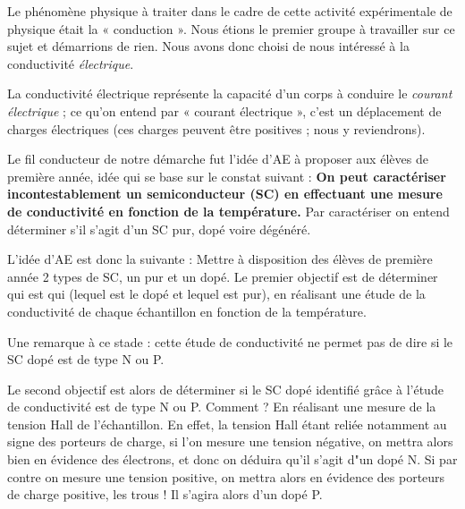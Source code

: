 Le phénomène physique à traiter dans le cadre de cette activité expérimentale de physique était la « conduction ». 
Nous étions le premier groupe à travailler sur ce sujet et démarrions de rien. 
Nous avons donc choisi de nous intéressé à la conductivité \textit{électrique}.

La conductivité électrique représente la capacité d'un corps à conduire le \textit{courant électrique} ; 
ce qu'on entend par « courant électrique », c'est un déplacement de charges électriques 
(ces charges peuvent être positives ; nous y reviendrons).

\bigskip
Le fil conducteur de notre démarche fut l'idée d'AE à proposer aux élèves de première année, 
idée qui se base sur le constat suivant :
\textbf{On peut caractériser incontestablement un semiconducteur (SC) en effectuant 
une mesure de conductivité en fonction de la température.}
Par caractériser on entend déterminer s'il s'agit d'un SC pur, dopé voire dégénéré.

\bigskip
L'idée d'AE est donc la suivante :
Mettre à disposition des élèves de première année 2 types de SC, un pur et un dopé. 
Le premier objectif est de déterminer qui est qui (lequel est le dopé et lequel est pur), 
en réalisant une étude de la conductivité de chaque échantillon 
en fonction de la température.

Une remarque à ce stade : cette étude de conductivité ne permet pas de dire si le SC dopé est de type N ou P.

Le second objectif est alors de déterminer si le SC dopé identifié grâce à l'étude de 
conductivité est de type N ou P.
Comment ? En réalisant une mesure de la tension Hall de l'échantillon.
En effet, la tension Hall étant reliée notamment au signe des porteurs de charge, si l'on mesure une tension négative, 
on mettra alors bien en évidence des électrons, et donc on déduira qu'il s'agit d"un dopé N.
Si par contre on mesure une tension positive, on mettra alors en évidence des porteurs de charge positive, les trous !
Il s'agira alors d'un dopé P.
